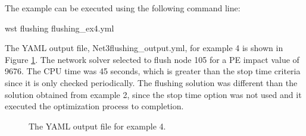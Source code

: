 The example can be executed using the following command line:

\begin{unknownListing}
wst flushing flushing_ex4.yml
\end{unknownListing}

The YAML output file, Net3flushing\_output.yml, for example 4 
is shown in Figure \ref{fig:flushing_ex4_yml}. The network solver selected to 
flush node 105 for a PE impact value of 9676. The CPU time was 45 seconds, 
which is greater than the stop time criteria since it is only checked periodically. 
The flushing solution was different than the solution obtained from example 2, 
since the stop time option was not used and it executed the optimization process to completion. 

\begin{figure}[h]
  \caption{The  YAML output file for example 4.}
  \label{fig:flushing_ex4_yml}
\end{figure}


